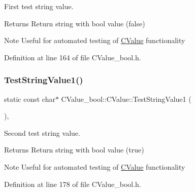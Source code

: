 First test string value. 

\begin{DoxyReturn}{Returns}
Return string with {\ttfamily bool} value ({\ttfamily false}) 
\end{DoxyReturn}
\begin{DoxyNote}{Note}
Useful for automated testing of \hyperlink{class_c_value__bool_1_1_c_value}{C\+Value} functionality 
\end{DoxyNote}


Definition at line 164 of file C\+Value\+\_\+bool.\+h.

\mbox{\label{class_c_value__bool_1_1_c_value_a2d82d7f212af01b330e3bc3514961a5a}} 
\subsubsection{\texorpdfstring{Test\+String\+Value1()}{TestStringValue1()}}
{\footnotesize\ttfamily static const char$\ast$ C\+Value\+\_\+bool\+::\+C\+Value\+::\+Test\+String\+Value1 (\begin{DoxyParamCaption}{ }\end{DoxyParamCaption})\hspace{0.3cm}{\ttfamily [inline]}, {\ttfamily [static]}}



Second test string value. 

\begin{DoxyReturn}{Returns}
Return string with {\ttfamily bool} value ({\ttfamily true}) 
\end{DoxyReturn}
\begin{DoxyNote}{Note}
Useful for automated testing of \hyperlink{class_c_value__bool_1_1_c_value}{C\+Value} functionality 
\end{DoxyNote}


Definition at line 178 of file C\+Value\+\_\+bool.\+h.

\mbox{\label{class_c_value__bool_1_1_c_value_a84d39c7918bfb7876640a8b64e2e8c95}} 
